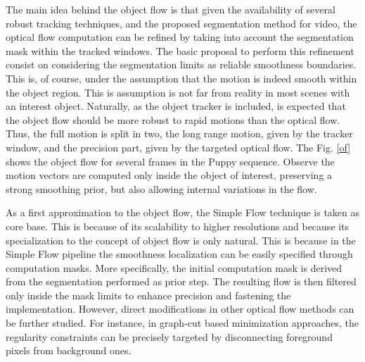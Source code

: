 The main idea behind the object flow is that given the availability of several robust tracking techniques, and the proposed
segmentation method for video, the optical flow computation can be refined by taking into account the segmentation mask within the tracked windows. 
The basic proposal to perform this refinement consist on considering the segmentation limits  as reliable smoothness boundaries. 
This is, of course, under the assumption that the motion is indeed smooth within the object region. 
This is assumption is not far from reality in most scenes with an interest object. 
Naturally, as the object tracker is included, is expected that the object flow should be more robust to rapid motions than the
optical flow. 
Thus, the full motion is split in two, the long range motion, given by the tracker window, and the precision part, given by the targeted optical flow. The Fig. \ref{of} shows 
the object flow for several frames in the Puppy sequence. Observe the motion vectors are computed only inside the object of interest, preserving a strong smoothing prior, but 
also allowing internal variations in the flow. 

As a first approximation to the object flow, the Simple Flow technique \cite{c21} is taken as core base. This is because of its scalability 
to higher resolutions and because its specialization to the concept of object flow is only natural. This is because in the Simple Flow pipeline 
the smoothness localization can be easily specified through computation masks. More specifically, the initial computation mask is derived from 
the segmentation performed as prior step. The resulting flow is then filtered only inside the mask limits to enhance precision and fastening the 
implementation. However, direct modifications in other optical flow methods can be further studied. For instance, in graph-cut based 
minimization approaches, the regularity constraints can be precisely targeted by disconnecting foreground pixels from background ones.


